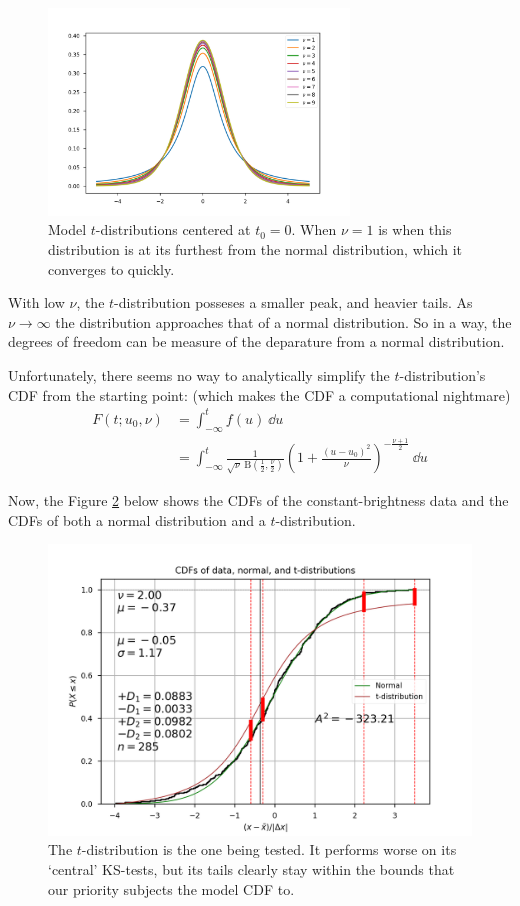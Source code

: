\documentclass[12pt, a4paper]{article}
\begin{document}
\begin{figure}[H]
\centering
\includegraphics[width=8cm]{t_dist}
\caption{Model $t$-distributions centered at $t_0=0$. When $\nu=1$ is when this distribution is at its furthest from the normal distribution, which it converges to quickly.}
\label{fig:t_dist}
\end{figure}

With low $\nu$, the $t$-distribution posseses a smaller peak, and heavier tails.
As $\nu \rightarrow \infty$ the distribution approaches that of a normal distribution.
So in a way, the degrees of freedom can be measure of the deparature from a normal distribution.

Unfortunately, there seems no way to analytically simplify the $t$-distribution's CDF from the starting point: (which makes the CDF a computational nightmare)
\begin{equation*}
\begin{aligned}
F(t; u_0, \nu) &= \int_{-\infty}^tf(u)\ \dd u
\\&= \int_{-\infty}^t
\frac{1}{\sqrt{\nu}\ \mathrm{B}(\frac12, \frac{\nu}{2})}
\left( 1+\frac{(u-u_0)^2}{\nu}\right)^{-\frac{\nu+1}{2}}
\ \dd u
\end{aligned}
\end{equation*}

Now, the Figure \ref{fig:t_cdf} below shows the CDFs of the constant-brightness data and the CDFs of both a normal distribution and a $t$-distribution.

\begin{figure}[H]
\centering
\includegraphics[width=\textwidth]{t_cdf}
\caption{The $t$-distribution is the one being tested.
  It performs worse on its `central' KS-tests, but its tails clearly stay within the bounds that our priority subjects the model CDF to.
}
\label{fig:t_cdf}
\end{figure}
\end{document}
